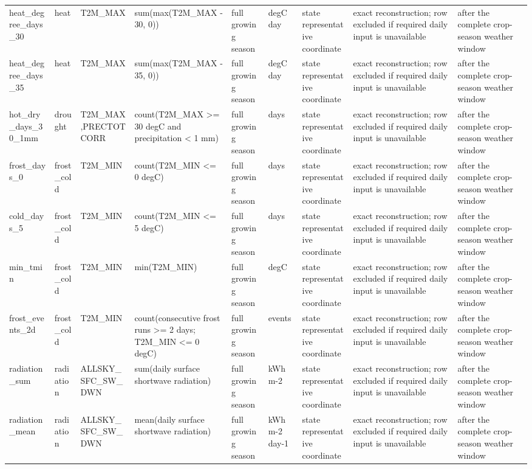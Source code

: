 \begin{tabular}{p{}p{}p{}p{}p{}p{}p{}p{}p{}}
heat\_degree\_days\_30 & heat & T2M\_MAX & sum(max(T2M\_MAX - 30, 0)) & full growing season & degC day & state representative coordinate & exact reconstruction; row excluded if required daily input is unavailable & after the complete crop-season weather window \\
heat\_degree\_days\_35 & heat & T2M\_MAX & sum(max(T2M\_MAX - 35, 0)) & full growing season & degC day & state representative coordinate & exact reconstruction; row excluded if required daily input is unavailable & after the complete crop-season weather window \\
hot\_dry\_days\_30\_1mm & drought & T2M\_MAX,PRECTOTCORR & count(T2M\_MAX >= 30 degC and precipitation < 1 mm) & full growing season & days & state representative coordinate & exact reconstruction; row excluded if required daily input is unavailable & after the complete crop-season weather window \\
frost\_days\_0 & frost\_cold & T2M\_MIN & count(T2M\_MIN <= 0 degC) & full growing season & days & state representative coordinate & exact reconstruction; row excluded if required daily input is unavailable & after the complete crop-season weather window \\
cold\_days\_5 & frost\_cold & T2M\_MIN & count(T2M\_MIN <= 5 degC) & full growing season & days & state representative coordinate & exact reconstruction; row excluded if required daily input is unavailable & after the complete crop-season weather window \\
min\_tmin & frost\_cold & T2M\_MIN & min(T2M\_MIN) & full growing season & degC & state representative coordinate & exact reconstruction; row excluded if required daily input is unavailable & after the complete crop-season weather window \\
frost\_events\_2d & frost\_cold & T2M\_MIN & count(consecutive frost runs >= 2 days; T2M\_MIN <= 0 degC) & full growing season & events & state representative coordinate & exact reconstruction; row excluded if required daily input is unavailable & after the complete crop-season weather window \\
radiation\_sum & radiation & ALLSKY\_SFC\_SW\_DWN & sum(daily surface shortwave radiation) & full growing season & kWh m-2 & state representative coordinate & exact reconstruction; row excluded if required daily input is unavailable & after the complete crop-season weather window \\
radiation\_mean & radiation & ALLSKY\_SFC\_SW\_DWN & mean(daily surface shortwave radiation) & full growing season & kWh m-2 day-1 & state representative coordinate & exact reconstruction; row excluded if required daily input is unavailable & after the complete crop-season weather window \\
\bottomrule
\end{tabular}

